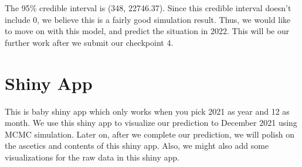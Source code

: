 \documentclass[
]{book}
\begin{document}
The 95\% credible interval is (348, 22746.37). Since this credible interval doesn't include 0, we believe this is a fairly good simulation result. Thus, we would like to move on with this model, and predict the situation in 2022. This will be our further work after we submit our checkpoint 4.

\hypertarget{shiny-app}{%
\chapter{Shiny App}\label{shiny-app}}

This is baby shiny app which only works when you pick 2021 as year and 12 as month. We use this shiny app to visualize our prediction to December 2021 using MCMC simulation. Later on, after we complete our prediction, we will polish on the ascetics and contents of this shiny app. Also, we might also add some visualizations for the raw data in this shiny app.
\end{document}
